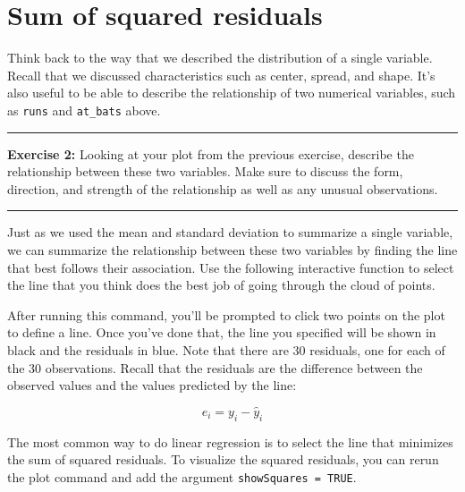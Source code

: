 \documentclass[]{book}
\newenvironment{Shaded}{\begin{snugshade}}{\end{snugshade}}
\newcommand{\DataTypeTok}[1]{\textcolor[rgb]{0.13,0.29,0.53}{#1}}
\newcommand{\KeywordTok}[1]{\textcolor[rgb]{0.13,0.29,0.53}{\textbf{#1}}}
\newcommand{\NormalTok}[1]{#1}
\newcommand{\OperatorTok}[1]{\textcolor[rgb]{0.81,0.36,0.00}{\textbf{#1}}}
\theoremstyle{definition}
\theoremstyle{definition}
\theoremstyle{definition}
\theoremstyle{remark}
\begin{document}
\hypertarget{sum-of-squared-residuals}{%
\section{Sum of squared residuals}\label{sum-of-squared-residuals}}

Think back to the way that we described the distribution of a single
variable. Recall that we discussed characteristics such as center,
spread, and shape. It's also useful to be able to describe the
relationship of two numerical variables, such as \texttt{runs} and
\texttt{at\_bats} above.

\begin{center}\rule{0.5\linewidth}{\linethickness}\end{center}

\textbf{Exercise 2:} Looking at your plot from the previous exercise,
describe the relationship between these two variables. Make sure to
discuss the form, direction, and strength of the relationship as well as
any unusual observations.

\begin{center}\rule{0.5\linewidth}{\linethickness}\end{center}

Just as we used the mean and standard deviation to summarize a single
variable, we can summarize the relationship between these two variables
by finding the line that best follows their association. Use the
following interactive function to select the line that you think does
the best job of going through the cloud of points.

\begin{Shaded}
\end{Shaded}

After running this command, you'll be prompted to click two points on
the plot to define a line. Once you've done that, the line you specified
will be shown in black and the residuals in blue. Note that there are 30
residuals, one for each of the 30 observations. Recall that the
residuals are the difference between the observed values and the values
predicted by the line:

\[
  e_i = y_i - \hat{y}_i
\]

The most common way to do linear regression is to select the line that
minimizes the sum of squared residuals. To visualize the squared
residuals, you can rerun the plot command and add the argument
\texttt{showSquares\ =\ TRUE}.
\end{document}
